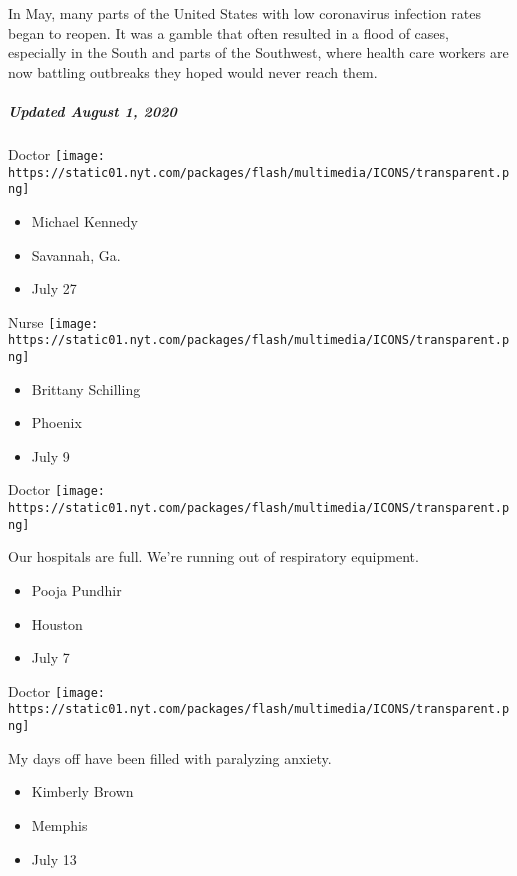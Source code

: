 In May, many parts of the United States with low coronavirus infection
rates began to reopen. It was a gamble that often resulted in a flood of
cases, especially in the South and parts of the Southwest, where health
care workers are now battling outbreaks they hoped would never reach
them.

\hypertarget{updated-august-1-2020}{%
\subparagraph{Updated August 1, 2020}\label{updated-august-1-2020}}

\protect\hyperlink{item-michael-kennedy}{}

Doctor
\texttt{[image: https://static01.nyt.com/packages/flash/multimedia/ICONS/transparent.png]}

\begin{itemize}
\tightlist
\item
  Michael Kennedy
\item
  Savannah, Ga.
\item
  July 27
\end{itemize}

\protect\hyperlink{item-brittany-schilling}{}

Nurse
\texttt{[image: https://static01.nyt.com/packages/flash/multimedia/ICONS/transparent.png]}

\begin{itemize}
\tightlist
\item
  Brittany Schilling
\item
  Phoenix
\item
  July 9
\end{itemize}

\protect\hyperlink{item-pooja-pundhir}{}

Doctor
\texttt{[image: https://static01.nyt.com/packages/flash/multimedia/ICONS/transparent.png]}

Our hospitals are full. We're running out of respiratory equipment.

\begin{itemize}
\tightlist
\item
  Pooja Pundhir
\item
  Houston
\item
  July 7
\end{itemize}

\protect\hyperlink{item-kimberly-brown}{}

Doctor
\texttt{[image: https://static01.nyt.com/packages/flash/multimedia/ICONS/transparent.png]}

My days off have been filled with paralyzing anxiety.

\begin{itemize}
\tightlist
\item
  Kimberly Brown
\item
  Memphis
\item
  July 13
\end{itemize}

